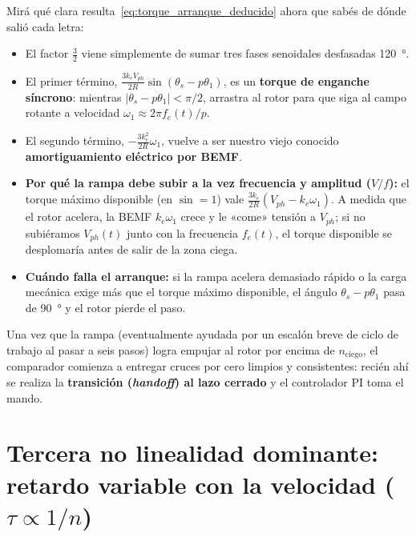 \documentclass[11pt,a4paper,oneside]{book}
\begin{document}
\begin{lectura}
Mirá qué clara resulta~\eqref{eq:torque_arranque_deducido} ahora que sabés de
dónde salió cada letra:
\begin{itemize}
  \item El factor $\frac{3}{2}$ viene simplemente de sumar tres fases senoidales
        desfasadas \SI{120}{\degree}.
  \item El primer término, $\frac{3k_e V_{ph}}{2R}\sin(\theta_s - p\theta_1)$,
        es un \textbf{torque de enganche síncrono}: mientras $|\theta_s - p\theta_1| < \pi/2$,
        arrastra al rotor para que siga al campo rotante a velocidad
        $\omega_1 \approx 2\pi f_e(t)/p$.
  \item El segundo término, $-\frac{3k_e^2}{2R}\omega_1$, vuelve a ser nuestro
        viejo conocido \textbf{amortiguamiento eléctrico por BEMF}.
  \item \textbf{Por qué la rampa debe subir a la vez frecuencia y amplitud ($V/f$):}
        el torque máximo disponible (en $\sin = 1$) vale
        $\frac{3k_e}{2R}(V_{ph} - k_e\omega_1)$. A medida que el rotor acelera,
        la BEMF $k_e\omega_1$ crece y le «come» tensión a $V_{ph}$; si no
        subiéramos $V_{ph}(t)$ junto con la frecuencia $f_e(t)$, el torque
        disponible se desplomaría antes de salir de la zona ciega.
  \item \textbf{Cuándo falla el arranque:} si la rampa acelera demasiado rápido
        o la carga mecánica exige más que el torque máximo disponible, el ángulo
        $\theta_s - p\theta_1$ pasa de \SI{90}{\degree} y el rotor pierde el paso.
\end{itemize}
\end{lectura}

Una vez que la rampa (eventualmente ayudada por un escalón breve de ciclo de
trabajo al pasar a seis pasos) logra empujar al rotor por encima de
$n_{\text{ciego}}$, el comparador comienza a entregar cruces por cero limpios y
consistentes: recién ahí se realiza la \textbf{transición (\emph{handoff}) al
lazo cerrado} y el controlador PI toma el mando.

\section{Tercera no linealidad dominante: retardo variable con la velocidad (\texorpdfstring{$\tau \propto 1/n$}{tau proporcional a 1/n})}
\end{document}
